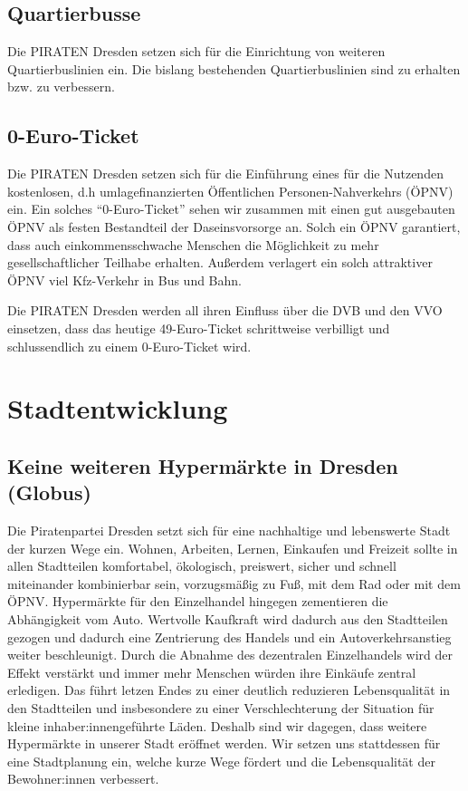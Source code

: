 \documentclass[a4paper, 11pt]{article}
\begin{document}
\subsection{Quartierbusse}
Die PIRATEN Dresden setzen sich für die Einrichtung von weiteren Quartierbuslinien ein. Die bislang bestehenden Quartierbuslinien sind zu erhalten bzw. zu verbessern.



\subsection{0-Euro-Ticket}
Die PIRATEN Dresden setzen sich für die Einführung eines für die Nutzenden kostenlosen, d.h umlagefinanzierten Öffentlichen Personen-Nahverkehrs (ÖPNV) ein. Ein solches ``0-Euro-Ticket'' sehen wir zusammen mit einen gut ausgebauten ÖPNV als festen Bestandteil der Daseinsvorsorge an. Solch ein ÖPNV garantiert, dass auch einkommensschwache Menschen die Möglichkeit zu mehr gesellschaftlicher Teilhabe erhalten. Außerdem verlagert ein solch attraktiver ÖPNV viel Kfz-Verkehr in Bus und Bahn.\newline

Die PIRATEN Dresden werden all ihren Einfluss über die DVB und den VVO einsetzen, dass das heutige 49-Euro-Ticket schrittweise verbilligt und schlussendlich zu einem 0-Euro-Ticket wird.


\section{Stadtentwicklung}

\subsection{Keine weiteren Hypermärkte in Dresden (Globus)}

Die Piratenpartei Dresden setzt sich für eine nachhaltige und lebenswerte Stadt der kurzen Wege ein. Wohnen, Arbeiten, Lernen, Einkaufen und Freizeit sollte in allen Stadtteilen komfortabel, ökologisch, preiswert, sicher und schnell miteinander kombinierbar sein, vorzugsmäßig zu Fuß, mit dem Rad oder mit dem ÖPNV. Hypermärkte für den Einzelhandel hingegen zementieren die Abhängigkeit vom Auto. Wertvolle Kaufkraft wird dadurch aus den Stadtteilen gezogen und dadurch eine Zentrierung des Handels und ein Autoverkehrsanstieg weiter beschleunigt. Durch die Abnahme des dezentralen Einzelhandels wird der Effekt verstärkt und immer mehr Menschen würden ihre Einkäufe zentral erledigen. Das führt letzen Endes zu einer deutlich reduzieren Lebensqualität in den Stadtteilen und insbesondere zu einer Verschlechterung der Situation für kleine inhaber:innengeführte Läden. Deshalb sind wir dagegen, dass weitere Hypermärkte in unserer Stadt eröffnet werden. Wir setzen uns stattdessen für eine Stadtplanung ein, welche kurze Wege fördert und die Lebensqualität der Bewohner:innen verbessert. \newline
\end{document}
